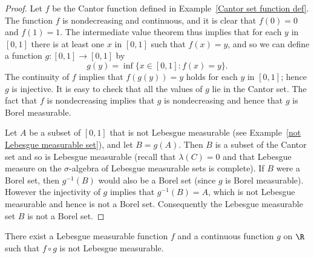 \begin{proof}
Let $f$ be the Cantor function defined in Example~\ref{Cantor set function def}. The function $f$ is nondecreasing and continuous, and it is clear that $f(0)=0$ and $f(1)=1$. The intermediate value theorem thus implies that for each $y$ in $[0,1]$ there is at least one $x$ in $[0,1]$ such that $f(x)=y$, and so we can define a function $g:[0,1]\to[0,1]$ by
\[g(y)=\inf\{x\in[0,1]:f(x)=y\}.\]
The continuity of $f$ implies that $f(g(y))=y$ holds for each $y$ in $[0,1]$; hence $g$ is injective. It is easy to check that all the values of $g$ lie in the Cantor set. The fact that $f$ is nondecreasing implies that $g$ is nondecreasing and hence that $g$ is Borel measurable.\par
Let $A$ be a subset of $[0,1]$ that is not Lebesgue measurable (see Example~\ref{not Lebesgue measurable set}), and let $B=g(A)$. Then $B$ is a subset of the Cantor set and so is Lebesgue measurable (recall that $\lambda(C)=0$ and that Lebesgue measure on the $\sigma$-algebra of Lebesgue measurable sets is complete). If $B$ were a Borel set, then $g^{-1}(B)$ would also be a Borel set (since $g$ is Borel measurable). However the injectivity of $g$ implies that $g^{-1}(B)=A$, which is not Lebesgue measurable and hence is not a Borel set. Consequently the Lebesgue measurable set $B$ is not a Borel set.
\end{proof}
\begin{proposition}\label{Lebesgue composition continuous no Lebesgue}
There exist a Lebesgue measurable function $f$ and a continuous function $g$ on $\R$ such that $f\circ g$ is not Lebesgue measurable.
\end{proposition}
